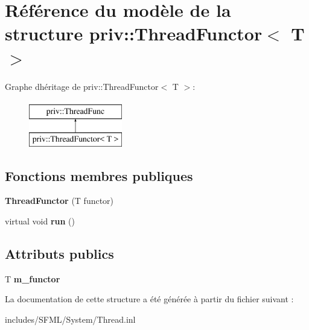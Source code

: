 \hypertarget{structpriv_1_1ThreadFunctor}{}\section{Référence du modèle de la structure priv\+:\+:Thread\+Functor$<$ T $>$}
\label{structpriv_1_1ThreadFunctor}
Graphe d\textquotesingle{}héritage de priv\+:\+:Thread\+Functor$<$ T $>$\+:\begin{figure}[H]
\begin{center}
\leavevmode
\includegraphics[height=2.000000cm]{structpriv_1_1ThreadFunctor}
\end{center}
\end{figure}
\subsection*{Fonctions membres publiques}
\begin{DoxyCompactItemize}
\item 
\mbox{\label{structpriv_1_1ThreadFunctor_a2df57df5cd6f7396b033512bb0e01848}} 
{\bfseries Thread\+Functor} (T functor)
\item 
\mbox{\label{structpriv_1_1ThreadFunctor_a8bb44b4b46d08d844d070ae3fdb251d7}} 
virtual void {\bfseries run} ()
\end{DoxyCompactItemize}
\subsection*{Attributs publics}
\begin{DoxyCompactItemize}
\item 
\mbox{\label{structpriv_1_1ThreadFunctor_a73254bbde4d3452de1aeda531ca632b2}} 
T {\bfseries m\+\_\+functor}
\end{DoxyCompactItemize}


La documentation de cette structure a été générée à partir du fichier suivant \+:\begin{DoxyCompactItemize}
\item 
includes/\+S\+F\+M\+L/\+System/Thread.\+inl\end{DoxyCompactItemize}

